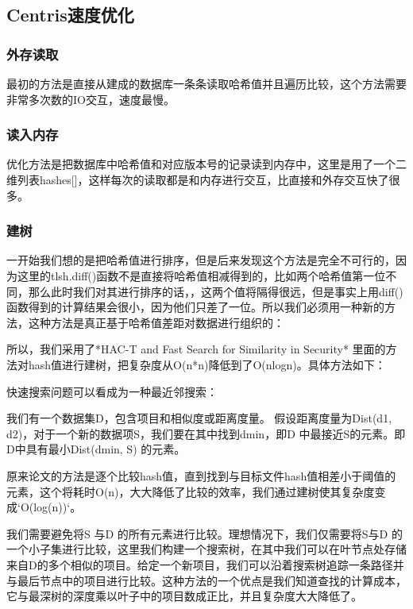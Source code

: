 \documentclass{cjc}
\begin{document}
\subsection{Centris速度优化}
\subsubsection{外存读取}

最初的方法是直接从建成的数据库一条条读取哈希值并且遍历比较，这个方法需要非常多次数的IO交互，速度最慢。
\subsubsection{读入内存}
优化方法是把数据库中哈希值和对应版本号的记录读到内存中，这里是用了一个二维列表hashes[]，这样每次的读取都是和内存进行交互，比直接和外存交互快了很多。

\subsubsection{建树}一开始我们想的是把哈希值进行排序，但是后来发现这个方法是完全不可行的，因为这里的tlsh.diff()函数不是直接将哈希值相减得到的，比如两个哈希值第一位不同，那么此时我们对其进行排序的话，，这两个值将隔得很远，但是事实上用diff()函数得到的计算结果会很小，因为他们只差了一位。所以我们必须用一种新的方法，这种方法是真正基于哈希值差距对数据进行组织的：



所以，我们采用了*HAC-T and Fast Search for Similarity in Security* 里面的方法对hash值进行建树，把复杂度从O(n*n)降低到了O(nlogn)。具体方法如下：

快速搜索问题可以看成为一种最近邻搜索： 

我们有一个数据集D，包含项目和相似度或距离度量。 假设距离度量为Dist(d1, d2)，对于一个新的数据项S，我们要在其中找到dmin，即D 中最接近S的元素。即D中具有最小Dist(dmin, S) 的元素。

原来论文的方法是逐个比较hash值，直到找到与目标文件hash值相差小于阈值的元素，这个将耗时O(n)，大大降低了比较的效率，我们通过建树使其复杂度变成`O(log(n))`。

我们需要避免将S 与D 的所有元素进行比较。理想情况下，我们仅需要将S与D 的一个小子集进行比较，这里我们构建一个搜索树，在其中我们可以在叶节点处存储来自D的多个相似的项目。给定一个新项目，我们可以沿着搜索树追踪一条路径并与最后节点中的项目进行比较。这种方法的一个优点是我们知道查找的计算成本，它与最深树的深度乘以叶子中的项目数成正比，并且复杂度大大降低了。

\end{document}
